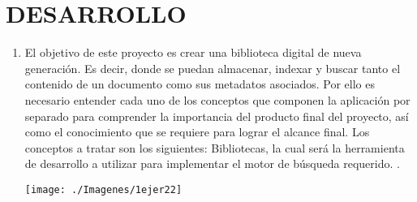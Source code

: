 \section{DESARROLLO} 

\begin{enumerate}[1.]
	\item El objetivo de este proyecto es crear una biblioteca digital de nueva generación.
	Es decir, donde se puedan almacenar, indexar y buscar tanto el contenido de un documento como sus metadatos asociados.
	Por ello es necesario entender cada uno de los conceptos que componen la aplicación por separado para comprender la importancia 	del producto final del 	proyecto, así como el conocimiento que se requiere para lograr el alcance final.
	Los conceptos a tratar son los siguientes: Bibliotecas, la cual será la	herramienta de desarrollo a utilizar para implementar el 	motor de búsqueda
	requerido. .
    


	\begin{center}
	\texttt{[image: ./Imagenes/1ejer22]} 
	\end{center}

\end{enumerate} 
